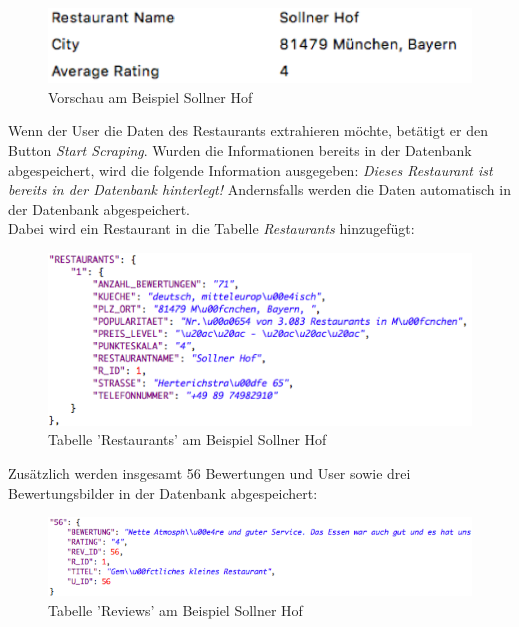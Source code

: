 \documentclass[a4paper,oneside,12pt]{report}
\begin{document}
	\begin{figure}[H]
		\centering
		\begin{minipage}[b]{0.45\textwidth}
			\includegraphics[width=\textwidth]{Bilder/PreviewSollnerHof.png}
		\end{minipage}
		\centering
		\caption[Vorschau am Beispiel Sollner Hof]{Vorschau am Beispiel Sollner Hof}
		\label{pic-PreviewSollnerHof}
	\end{figure}
	
	Wenn der User die Daten des Restaurants extrahieren möchte, betätigt er den Button \textit{Start Scraping}.	Wurden die Informationen bereits in der Datenbank abgespeichert, wird die folgende Information ausgegeben:
	\textit{Dieses Restaurant ist bereits in der Datenbank hinterlegt!} Andernsfalls werden die Daten automatisch in der Datenbank abgespeichert. 
	\\
	Dabei wird ein Restaurant in die Tabelle \textit{Restaurants} hinzugefügt:
	
	\begin{figure}[H]
		\centering
		\begin{minipage}[b]{0.7\textwidth}
			\includegraphics[width=\textwidth]{Bilder/JSONRestaurant.png}
		\end{minipage}
		\centering
		\caption[Tabelle 'Restaurants' am Beispiel Sollner Hof]{Tabelle 'Restaurants' am Beispiel Sollner Hof}
		\label{pic-JSONRestaurant}
	\end{figure}
	
	Zusätzlich werden insgesamt 56 Bewertungen und User sowie drei Bewertungsbilder in der Datenbank abgespeichert:
	
	\begin{figure}[H]
		\centering
		\begin{minipage}[b]{0.9\textwidth}
			\includegraphics[width=\textwidth]{Bilder/JSONReview.png}
		\end{minipage}
		\centering
		\caption[Tabelle 'Reviews' am Beispiel Sollner Hof]{Tabelle 'Reviews' am Beispiel Sollner Hof}
		\label{pic-JSONReview}
	\end{figure}
	
\end{document}

